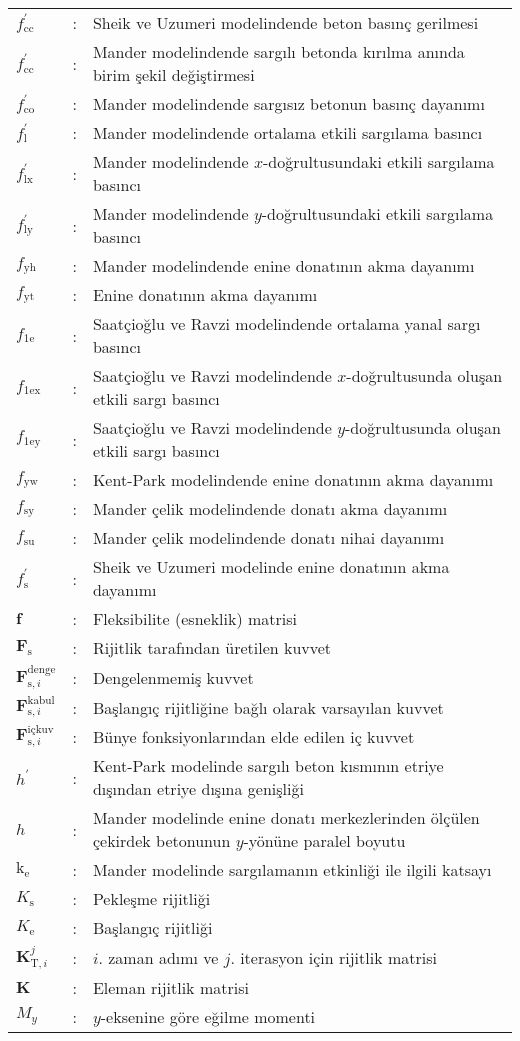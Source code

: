 \begin{longtable}[c]{>{\raggedright}p{1cm}l>{\raggedright}p{13.4cm}}
$f_{\text{cc}}^{'}$  & :  & Sheik ve Uzumeri modelindende beton basınç gerilmesi\tabularnewline
$f_{\text{cc}}^{'}$  & :  & Mander modelindende sargılı betonda kırılma anında birim şekil değiştirmesi\tabularnewline
$f_{\text{co}}^{'}$  & :  & Mander modelindende sargısız betonun basınç dayanımı \tabularnewline
$f_{\text{l}}^{'}$  & :  & Mander modelindende ortalama etkili sargılama basıncı\tabularnewline
$f_{\text{lx}}^{'}$  & :  & Mander modelindende $x$-doğrultusundaki etkili sargılama basıncı\tabularnewline
$f_{\text{ly}}^{'}$  & :  & Mander modelindende $y$-doğrultusundaki etkili sargılama basıncı\tabularnewline
$f_{\text{yh}}$  & :  & Mander modelindende enine donatının akma dayanımı\tabularnewline
$f_{\text{yt}}$  & :  & Enine donatının akma dayanımı\tabularnewline
$f_{\text{1e}}$  & :  & Saatçioğlu ve Ravzi modelindende ortalama yanal sargı basıncı\tabularnewline
$f_{\text{1ex}}$  & :  & Saatçioğlu ve Ravzi modelindende $x$-doğrultusunda oluşan etkili
sargı basıncı\tabularnewline
$f_{\text{1ey}}$  & :  & Saatçioğlu ve Ravzi modelindende $y$-doğrultusunda oluşan etkili
sargı basıncı\tabularnewline
$f_{\text{yw}}$  & :  & Kent-Park modelindende enine donatının akma dayanımı\tabularnewline
$f_{\text{sy}}$  & :  & Mander çelik modelindende donatı akma dayanımı\tabularnewline
$f_{\text{su}}$  & :  & Mander çelik modelindende donatı nihai dayanımı\tabularnewline
$f_{\text{s}}^{'}$  & :  & Sheik ve Uzumeri modelinde enine donatının akma dayanımı\tabularnewline
$\mathbf{f}$  & :  & Fleksibilite (esneklik) matrisi\tabularnewline
$\mathbf{F}_{\text{s}}$  & :  & Rijitlik tarafından üretilen kuvvet\tabularnewline
$\mathbf{F}_{\text{s},i}^{\text{denge}}$  & :  & Dengelenmemiş kuvvet\tabularnewline
$\mathbf{F}_{\text{s},i}^{\text{kabul}}$  & :  & Başlangıç rijitliğine bağlı olarak varsayılan kuvvet\tabularnewline
$\mathbf{F}_{\text{s},i}^{\text{içkuv}}$  & :  & Bünye fonksiyonlarından elde edilen iç kuvvet\tabularnewline
$h^{'}$  & :  & Kent-Park modelinde sargılı beton kısmının etriye dışından etriye
dışına genişliği\tabularnewline
$h$  & :  & Mander modelinde enine donatı merkezlerinden ölçülen çekirdek betonunun
$y$-yönüne paralel boyutu\tabularnewline
$\text{k}_{\text{e}}$  & :  & Mander modelinde sargılamanın etkinliği ile ilgili katsayı\tabularnewline
$K_{\text{s}}$  & :  & Pekleşme rijitliği \tabularnewline
$K_{\text{e}}$  & :  & Başlangıç rijitliği\tabularnewline
$\mathbf{K}_{\text{T},i}^{j}$  & :  & $i.$ zaman adımı ve $j.$ iterasyon için rijitlik matrisi \tabularnewline
$\mathbf{K}$  & :  & Eleman rijitlik matrisi\tabularnewline
$M_{y}$  & :  & $y$-eksenine göre eğilme momenti\tabularnewline

\end{longtable}
